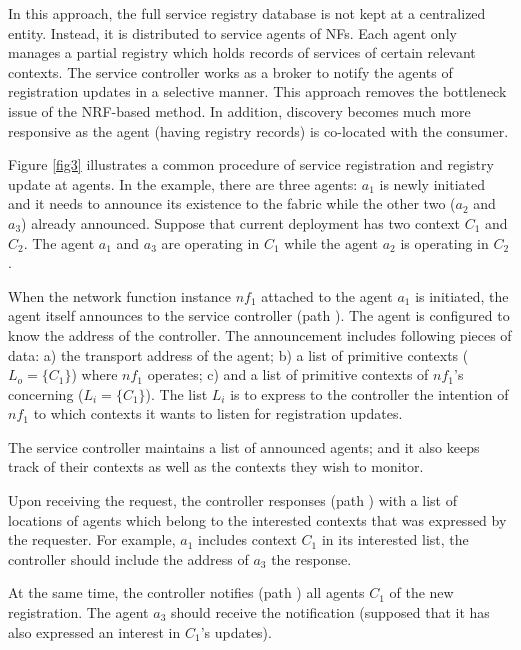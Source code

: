 \documentclass[conference]{IEEEtran}
\begin{document}
In this approach, the full service registry database is not kept at a
centralized entity. Instead, it is distributed to service agents of NFs. Each
agent only manages a partial registry which holds records of services of
certain relevant contexts. The service controller works as a broker to notify
the agents of registration updates in a selective manner.  This approach
removes the bottleneck issue of the NRF-based method. In addition, discovery
becomes much more responsive as the agent (having registry records) is co-located
with the consumer.

Figure \ref{fig3} illustrates a common procedure of service registration and
registry update at agents. In the example, there are three agents: $a_1$ is
newly initiated and it needs to announce its existence to the fabric while the
other two ($a_2$ and $a_3$)  already announced. Suppose that current deployment
has two context $C_1$ and $C_2$. The agent $a_1$ and $a_3$ are operating in
$C_1$ while the agent $a_2$ is operating in $C_2$.

When the network function instance $nf_1$ attached to the agent $a_1$ is
initiated, the agent itself announces to the service controller (path
). The agent is configured to know the address of the controller.  The
announcement includes following pieces of data: a) the transport address of the
agent; b) a list of primitive contexts ($L_o = \{C_1\}$) where $nf_1$ operates;
c) and a list of primitive contexts of $nf_1$'s concerning ($L_i = \{C_1\}$).
The list $L_i$ is to express to the controller the intention of $nf_1$ to which
contexts it wants to listen for registration updates. 

The service controller maintains a list of announced agents; and it also keeps
track of their contexts as well as the contexts they wish to monitor.

Upon receiving the request, the controller responses (path ) with a list of
locations of agents which belong to the interested contexts that was expressed
by the requester. For example, $a_1$ includes context $C_1$ in its interested
list, the controller should include the address of $a_3$ the response.

At the same time, the controller notifies (path ) all agents $C_1$ of
the new registration. The agent $a_3$ should receive the notification (supposed
that it has also expressed an interest in $C_1$'s updates).
\end{document}
